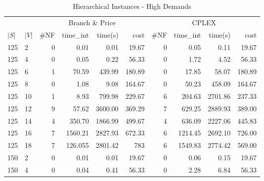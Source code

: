 \begin{appendices}
\begin{table*}[h]
\scriptsize
\begin{center}
\caption{Hierarchical Instances - High Demands}
\begin{tabular} {l l | r r r r | r r r r}
\hline
       &                                 &  \multicolumn{4}{c|}{Branch \& Price}                                & \multicolumn{4}{c}{CPLEX}                 \\
 $|S|$ & $|V|$                           &  \#NF  & time\_int     &  time(s)      &  cost            &  \#NF   &  time\_int   &  time(s)       &  cost       \\ 
\hline
125 & 2   &  0            &  0.01          &  0.01        &  19.67     &  0           &  0.05            &  0.11       &  19.67     \\ 
125 & 4   &  0            &  0.05          &  0.22        &  56.33     &  0           &  1.72            &  4.52       &  56.33     \\ 
125 & 6   &  1            &  70.59         &  439.99      &  180.89    &  0           &  17.85           &  58.07      &  180.89    \\ 
125 & 8   &  0            &  1.08          &  9.08        &  164.67    &  0           &  50.23           &  458.09     &  164.67    \\ 
125 & 10  &  1            &  8.93          &  799.98      &  229.67    &  6           &  204.63          &  2701.86    &  237.33    \\ 
125 & 12  &  9            &  57.62         &  3600.00     &  369.29    &  7           &  629.25          &  2889.93    &  389.00    \\ 
125 & 14  &  4            &  350.70        &  1866.99     &  499.67    &  4           &  636.09          &  2227.06    &  445.83    \\ 
125 & 16  &  7            &  1560.21       &  2827.93     &  672.33    &  6           &  1214.45         &  2692.10    &  726.00    \\ 
125 & 18  &  7            &  126.055       &  2801.42     &  783       &  6           &  1549.83         &  2774.42    &  569.00    \\ 
150 & 2   &  0            &  0.01          &  0.01        &  19.67     &  0           &  0.06            &  0.15       &  19.67     \\ 
150 & 4   &  0            &  0.04          &  0.41        &  56.33     &  0           &  2.28            &  6.84       &  56.33     \\ 

\end{tabular}
\end{center}
\end{table*}
\end{appendices}
